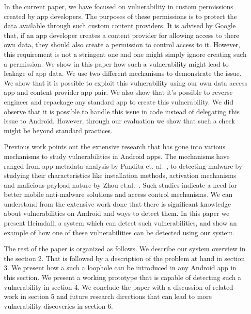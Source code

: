 In the current paper, we have focused on vulnerability in custom permissions created by app developers. The purposes of these permissions is to protect the data available through such custom content providers. It is advised by Google that, if an app developer creates a content provider for allowing access to there own data, they should also create a permission to control access to it. However, this requirement is not a stringent one and one might simply ignore creating such a permission. We show in this paper how such a vulnerability might lead to leakage of app data. We use two different mechanisms to demonstrate the issue. We show that it is possible to exploit this vulnerability using our own data access app and content provider app pair. We also show that it's possible to reverse engineer and repackage any standard app to create this vulnerability. We did observe that it is possible to handle this issue in code instead of delegating this issue to Android. However, through our evaluation we show that such a check might be beyond standard practices. 

Previous work points out the extensive research that has gone into various mechanisms to study vulnerabilities in Android apps. The mechanisms have ranged from app metadata analysis by Pandita et. al.~\cite{Pandita2013Whyper}, to detecting malware by studying their characteristics like installation methods, activation mechanisms and malicious payload nature by Zhou et.al.~\cite{Zhou2012MalwareGenomeProject}. Such studies indicate a need for better mobile anti-malware solutions and access control mechanisms. We can understand from the extensive work done that there is significant knowledge about vulnerabilities on Android and ways to detect them. In this paper we present Heimdall, a system which can detect such vulnerabilities, and show an example of how one of these vulnerabilities can be detected using our system. 

The rest of the paper is organized as follows. We describe our system overview in the section 2. That is followed by a description of the problem at hand in section 3. We present how a such a loophole can be introduced in any Android app in this section. We present a working prototype that is capable of detecting such a vulnerability in section 4. We conclude the paper with a discussion of related work in section 5 and future research directions that can lead to more vulnerability discoveries in section 6.



